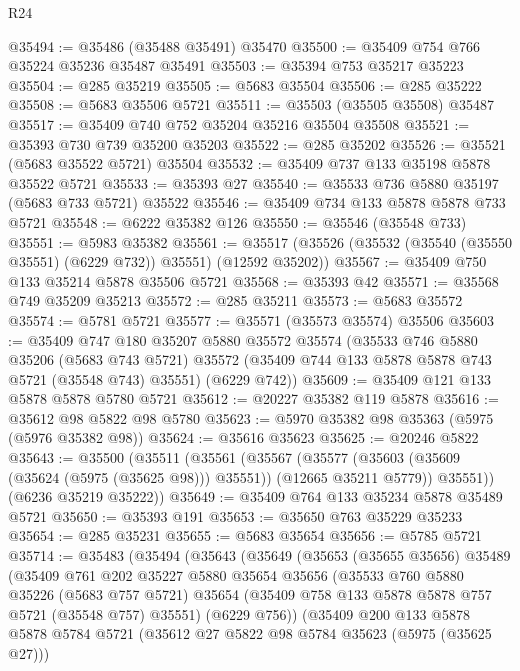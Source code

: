 \begin{lexlean}{R24}
\begin{coremodule}
@35494 := @35486 (@35488 @35491) @35470
@35500 := @35409 @754 @766 @35224 @35236 @35487 @35491
@35503 := @35394 @753 @35217 @35223
@35504 := @285 @35219
@35505 := @5683 @35504
@35506 := @285 @35222
@35508 := @5683 @35506 @5721
@35511 := @35503 (@35505 @35508) @35487
@35517 := @35409 @740 @752 @35204 @35216 @35504 @35508
@35521 := @35393 @730 @739 @35200 @35203
@35522 := @285 @35202
@35526 := @35521 (@5683 @35522 @5721) @35504
@35532 := @35409 @737 @133 @35198 @5878 @35522 @5721
@35533 := @35393 @27
@35540 := @35533 @736 @5880 @35197 (@5683 @733 @5721) @35522
@35546 := @35409 @734 @133 @5878 @5878 @733 @5721
@35548 := @6222 @35382 @126
@35550 := @35546 (@35548 @733)
@35551 := @5983 @35382
@35561 := @35517 (@35526 (@35532 (@35540 (@35550 @35551) (@6229 @732)) @35551) (@12592 @35202))
@35567 := @35409 @750 @133 @35214 @5878 @35506 @5721
@35568 := @35393 @42
@35571 := @35568 @749 @35209 @35213
@35572 := @285 @35211
@35573 := @5683 @35572
@35574 := @5781 @5721
@35577 := @35571 (@35573 @35574) @35506
@35603 := @35409
    @747
    @180
    @35207
    @5880
    @35572
    @35574
    (@35533
      @746
      @5880
      @35206
      (@5683 @743 @5721)
      @35572
      (@35409 @744 @133 @5878 @5878 @743 @5721 (@35548 @743) @35551)
      (@6229 @742))
@35609 := @35409 @121 @133 @5878 @5878 @5780 @5721
@35612 := @20227 @35382 @119 @5878
@35616 := @35612 @98 @5822 @98 @5780
@35623 := @5970 @35382 @98 @35363 (@5975 (@5976 @35382 @98))
@35624 := @35616 @35623
@35625 := @20246 @5822
@35643 := @35500
    (@35511
      (@35561
        (@35567
          (@35577 (@35603 (@35609 (@35624 (@5975 (@35625 @98))) @35551)) (@12665 @35211 @5779))
          @35551))
      (@6236 @35219 @35222))
@35649 := @35409 @764 @133 @35234 @5878 @35489 @5721
@35650 := @35393 @191
@35653 := @35650 @763 @35229 @35233
@35654 := @285 @35231
@35655 := @5683 @35654
@35656 := @5785 @5721
@35714 := @35483
    (@35494
      (@35643
        (@35649
          (@35653
            (@35655 @35656)
            @35489
            (@35409
              @761
              @202
              @35227
              @5880
              @35654
              @35656
              (@35533
                @760
                @5880
                @35226
                (@5683 @757 @5721)
                @35654
                (@35409 @758 @133 @5878 @5878 @757 @5721 (@35548 @757) @35551)
                (@6229 @756))
              (@35409
                @200
                @133
                @5878
                @5878
                @5784
                @5721
                (@35612 @27 @5822 @98 @5784 @35623 (@5975 (@35625 @27)))

\end{coremodule}
\end{lexlean}
